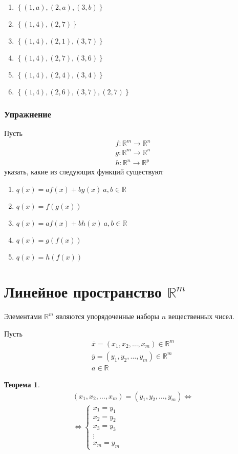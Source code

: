 \documentclass[]{article}
\newtheorem{thr}{Теорема}
\begin{document}
	\begin{enumerate}
		\item $\left\{(1,a),(2,a),(3,b)\right\}$ 
		\item $\left\{(1,4),(2,7)\right\}$ 
		\item $\left\{(1,4),(2,1),(3,7)\right\}$ 
		\item $\left\{(1,4),(2,7),(3,6)\right\}$
		\item $\left\{(1,4),(2,4),(3,4)\right\}$  
		\item $\left\{(1,4),(2,6),(3,7),(2,7)\right\}$  
	\end{enumerate}
	
	\subsubsection{Упражнение}
	Пусть \begin{gather*}
		f:\mathbb{R}^m\rightarrow\mathbb{R}^n
		\\
		g:\mathbb{R}^m\rightarrow\mathbb{R}^n
		\\
		h:\mathbb{R}^n\rightarrow\mathbb{R}^p
	\end{gather*}
	указать, какие из следующих функций существуют
	
	\begin{enumerate}
		\item $q(x)=af(x)+bg(x)\ a,b\in\mathbb{R}$
		\item $q(x)=f(g(x))$
		\item $q(x)=af(x)+bh(x)\ a,b\in\mathbb{R}$
		\item $q(x)=g(f(x))$
		\item $q(x)=h(f(x))$
	\end{enumerate}
	
	\section{Линейное пространство $\mathbb{R}^m$}
	
	Элементами $\mathbb{R}^m$ являются упорядоченные наборы $n$ вещественных чисел.
	
	Пусть \begin{gather*}
		\overline{x}=(x_1, x_2, \ldots, x_m)\in \mathbb{R}^m 
		\\
		\overline{y}=(y_1, y_2, \ldots, y_m)\in \mathbb{R}^m 
		\\
		a\in \mathbb{R}
	\end{gather*}
	
	\begin{thr}
		\begin{gather*}
			(x_1, x_2, \ldots, x_m)=(y_1, y_2, \ldots, y_m)\Leftrightarrow
			\\
			\Leftrightarrow
			\begin{cases}
				x_1=y_1
				\\
				x_2=y_2
				\\
				x_3=y_3
				\\
				\vdots
				\\
				x_m=y_m
			\end{cases}
		\end{gather*}
	\end{thr}
	
\end{document}
